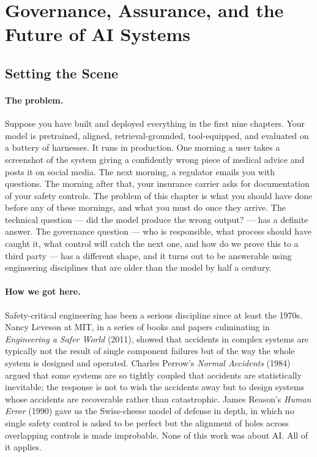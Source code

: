 \section{Governance, Assurance, and the Future of AI Systems}

\subsection*{Setting the Scene}

\paragraph{The problem.}
Suppose you have built and deployed everything in the first nine
chapters. Your model is pretrained, aligned, retrieval-grounded,
tool-equipped, and evaluated on a battery of harnesses. It runs in
production. One morning a user takes a screenshot of the system
giving a confidently wrong piece of medical advice and posts it on
social media. The next morning, a regulator emails you with
questions. The morning after that, your insurance carrier asks for
documentation of your safety controls. The problem of this chapter
is what you should have done before any of these mornings, and what
you must do once they arrive. The technical question --- did the
model produce the wrong output? --- has a definite answer. The
governance question --- who is responsible, what process should
have caught it, what control will catch the next one, and how do
we prove this to a third party --- has a different shape, and it
turns out to be answerable using engineering disciplines that are
older than the model by half a century.

\paragraph{How we got here.}
Safety-critical engineering has been a serious discipline since at
least the 1970s. Nancy Leveson at MIT, in a series of books and
papers culminating in \emph{Engineering a Safer World} (2011),
showed that accidents in complex systems are typically not the
result of single component failures but of the way the whole system
is designed and operated. Charles Perrow's \emph{Normal Accidents}
(1984) argued that some systems are so tightly coupled that
accidents are statistically inevitable; the response is not to wish
the accidents away but to design systems whose accidents are
recoverable rather than catastrophic. James Reason's
\emph{Human Error} (1990) gave us the Swiss-cheese model of
defense in depth, in which no single safety control is asked to be
perfect but the alignment of holes across overlapping controls is
made improbable. None of this work was about AI. All of it applies.


